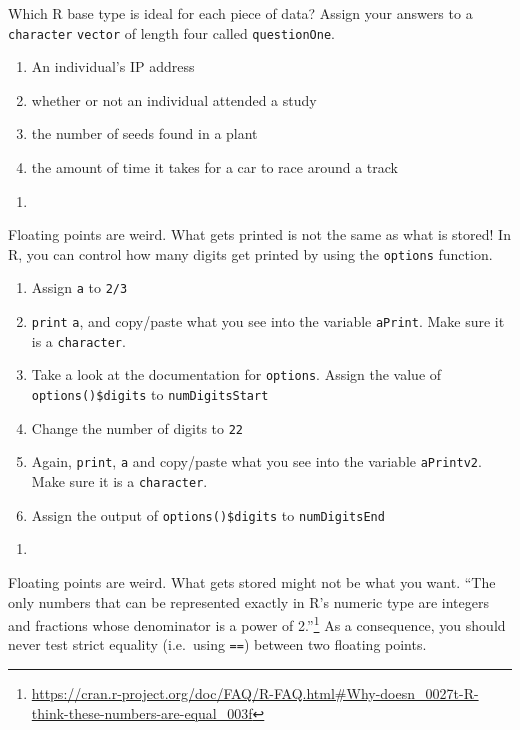 \documentclass[
  12pt,
  krantz2]{krantz}
\providecommand{\tightlist}{%
  \setlength{\itemsep}{0pt}\setlength{\parskip}{0pt}}
\renewcommand{\href}[2]{#2\footnote{\url{#1}}}
\begin{document}
Which R base type is ideal for each piece of data? Assign your answers to a \texttt{character} \texttt{vector} of length four called \texttt{questionOne}.

\begin{enumerate}
\def\labelenumi{\alph{enumi})}
\tightlist
\item
  An individual's IP address
\item
  whether or not an individual attended a study
\item
  the number of seeds found in a plant
\item
  the amount of time it takes for a car to race around a track
\end{enumerate}

\begin{enumerate}
\def\labelenumi{\arabic{enumi}.}
\setcounter{enumi}{1}
\tightlist
\item
\end{enumerate}

Floating points are weird. What gets printed is not the same as what is stored! In R, you can control how many digits get printed by using the \texttt{options} function.

\begin{enumerate}
\def\labelenumi{\alph{enumi})}
\tightlist
\item
  Assign \texttt{a} to \texttt{2/3}
\item
  \texttt{print} \texttt{a}, and copy/paste what you see into the variable \texttt{aPrint}. Make sure it is a \texttt{character}.
\item
  Take a look at the documentation for \texttt{options}. Assign the value of \texttt{options()\$digits} to \texttt{numDigitsStart}
\item
  Change the number of digits to \texttt{22}
\item
  Again, \texttt{print}, \texttt{a} and copy/paste what you see into the variable \texttt{aPrintv2}. Make sure it is a \texttt{character}.
\item
  Assign the output of \texttt{options()\$digits} to \texttt{numDigitsEnd}
\end{enumerate}

\begin{enumerate}
\def\labelenumi{\arabic{enumi}.}
\setcounter{enumi}{2}
\tightlist
\item
\end{enumerate}

Floating points are weird. What gets stored might not be what you want. \href{https://cran.r-project.org/doc/FAQ/R-FAQ.html\#Why-doesn_0027t-R-think-these-numbers-are-equal_003f}{``The only numbers that can be represented exactly in R's numeric type are integers and fractions whose denominator is a power of 2.''} As a consequence, you should never test strict equality (i.e.~using \texttt{==}) between two floating points.
\end{document}
